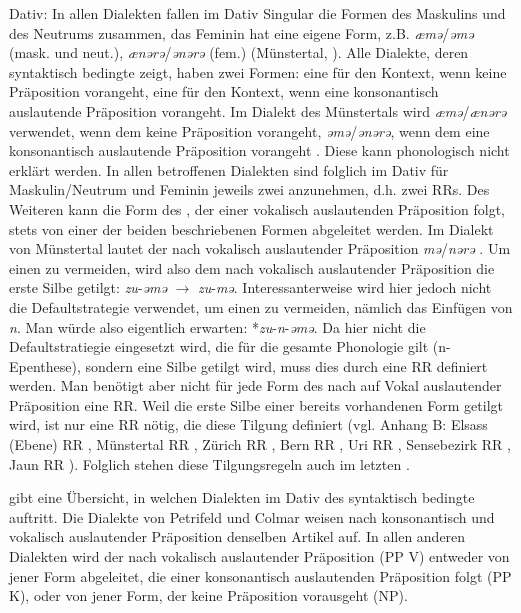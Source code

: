 {Dativ}: In allen Dialekten fallen im Dativ Singular die Formen des Maskulins und des Neutrums zusammen, das Feminin hat eine eigene Form, z.B. \textit{æmə}/\textit{əmə} (mask. und neut.), \textit{ænərə}/\textit{ənərə} (fem.) (Münstertal, \citealt[45]{Mankel1886}). Alle Dialekte, deren  syntaktisch bedingte  zeigt, haben zwei Formen: eine für den Kontext, wenn keine Präposition vorangeht, eine für den Kontext, wenn eine konsonantisch auslautende Präposition vorangeht. Im Dialekt des Münstertals wird \textit{æmə}/\textit{ænərə} verwendet, wenn dem  keine Präposition vorangeht, \textit{əmə}/\textit{ənərə}, wenn dem  eine konsonantisch auslautende Präposition vorangeht \citep[45-46]{Mankel1886}. Diese  kann phonologisch nicht erklärt werden. In allen betroffenen Dialekten sind folglich im Dativ für Maskulin/Neutrum und Feminin jeweils zwei  anzunehmen, d.h. zwei RRs. Des Weiteren kann die Form des , der einer vokalisch auslautenden Präposition folgt, stets von einer der beiden beschriebenen Formen abgeleitet werden. Im Dialekt von Münstertal lautet der  nach vokalisch auslautender Präposition \textit{mə}/\textit{nərə} \citep[45]{Mankel1886}. Um einen  zu vermeiden, wird also dem  nach vokalisch auslautender Präposition die erste Silbe getilgt: \textit{zu}-\textit{əmə} $\rightarrow$ \textit{zu}-\textit{mə}. Interessanterweise wird hier jedoch nicht die Defaultstrategie verwendet, um einen  zu vermeiden, nämlich das Einfügen von \textit{n}. Man würde also eigentlich erwarten: *\textit{zu}-\textit{n}-\textit{əmə}. Da hier nicht die Defaultstratiegie eingesetzt wird, die für die gesamte Phonologie gilt (n-Epenthese), sondern eine Silbe getilgt wird, muss dies durch eine RR definiert werden. Man benötigt aber nicht für jede Form des  nach auf Vokal auslautender Präposition eine RR. Weil die erste Silbe einer bereits vorhandenen Form getilgt wird, ist nur eine RR nötig, die diese Tilgung definiert (vgl. Anhang B: Elsass (Ebene) RR , Münstertal RR , Zürich RR , Bern RR , Uri RR , Sensebezirk RR , Jaun RR ). Folglich stehen diese Tilgungsregeln auch im letzten .

 gibt eine Übersicht, in welchen Dialekten im Dativ des  syntaktisch bedingte  auftritt. Die Dialekte von Petrifeld und Colmar weisen nach konsonantisch und vokalisch auslautender Präposition denselben Artikel auf. In allen anderen Dialekten wird der  nach vokalisch auslautender Präposition (PP V) entweder von jener Form abgeleitet, die einer konsonantisch auslautenden Präposition folgt (PP K), oder von jener Form, der keine Präposition vorausgeht (NP).

